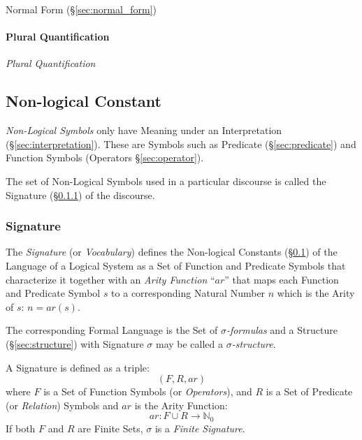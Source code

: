 Normal Form (\S\ref{sec:normal_form})



\paragraph{Plural Quantification}\label{sec:plural_quantification}
\hfill

\emph{Plural Quantification}



\subsection{Non-logical Constant}\label{sec:nonlogical_constant}

\emph{Non-Logical Symbols} only have Meaning under an Interpretation
(\S\ref{sec:interpretation}). These are Symbols such as Predicate
(\S\ref{sec:predicate}) and Function Symbols (Operators
\S\ref{sec:operator}).

The set of Non-Logical Symbols used in a particular discourse is
called the Signature (\S\ref{sec:signature}) of the discourse.



\subsubsection{Signature}\label{sec:signature}

The \emph{Signature} (or \emph{Vocabulary}) defines the Non-logical
Constants (\S\ref{sec:nonlogical_constant}) of the Language of a
Logical System as a Set of Function and Predicate Symbols that
characterize it together with an \emph{Arity Function} ``$ar$'' that
maps each Function and Predicate Symbol $s$ to a corresponding Natural
Number $n$ which is the Arity of $s$: $n = ar(s)$.

The corresponding Formal Language is the Set of
\emph{$\sigma$-formulas} and a Structure (\S\ref{sec:structure}) with
Signature $\sigma$ may be called a \emph{$\sigma$-structure}.

A Signature is defined as a triple:
\[
  (F,R,ar)
\]
where $F$ is a Set of Function Symbols (or \emph{Operators}), and $R$
is a Set of Predicate (or \emph{Relation}) Symbols and $ar$ is the
Arity Function:
\[
  ar: F \cup R \rightarrow \mathbb{N}_0
\]
If both $F$ and $R$ are Finite Sets, $\sigma$ is a \emph{Finite
  Signature}.

